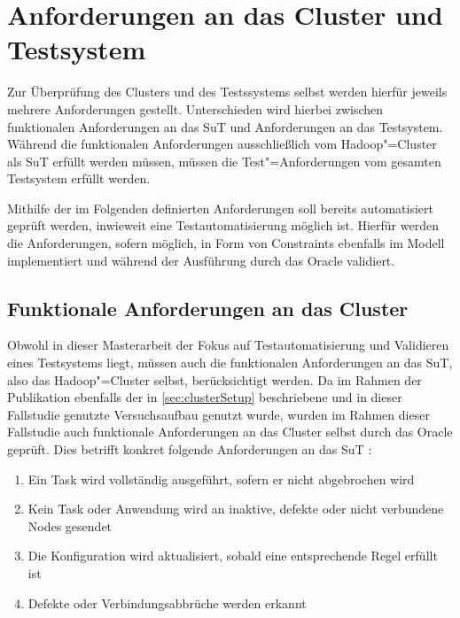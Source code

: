 \section{Anforderungen an das Cluster und Testsystem}
\label{sec:requirements}

Zur Überprüfung des Clusters und des Testssystems selbst werden hierfür jeweils mehrere Anforderungen gestellt.
Unterschieden wird hierbei zwischen funktionalen Anforderungen an das \gls{SuT} und Anforderungen an das Testsystem.
Während die funktionalen Anforderungen ausschließlich vom Hadoop"=Cluster als \gls{SuT} erfüllt werden müssen, müssen die Test"=Anforderungen vom gesamten Testsystem erfüllt werden.

Mithilfe der im Folgenden definierten Anforderungen soll bereits automatisiert geprüft werden, inwieweit eine Testautomatisierung möglich ist.
Hierfür werden die Anforderungen, sofern möglich, in Form von Constraints ebenfalls im Modell implementiert und während der Ausführung durch das Oracle validiert.

\subsection{Funktionale Anforderungen an das Cluster}
\label{subsec:functionalRequirements}

Obwohl in dieser Masterarbeit der Fokus auf Testautomatisierung und Validieren eines Testsystems liegt, müssen auch die funktionalen Anforderungen an das \gls{SuT}, also das Hadoop"=Cluster selbst, berücksichtigt werden.
Da im Rahmen der Publikation \cite{Eberhardinger2018} ebenfalls der in \cref{sec:clusterSetup} beschriebene und in dieser Fallstudie genutzte Versuchsaufbau genutzt wurde, wurden im Rahmen dieser Fallstudie auch funktionale Anforderungen an das Cluster selbst durch das Oracle geprüft.
Dies betrifft konkret folgende Anforderungen an das \gls{SuT} \cite{Eberhardinger2018}:

\begin{enumerate}
    \item Ein Task wird vollständig ausgeführt, sofern er nicht abgebrochen wird
    \item Kein Task oder Anwendung wird an inaktive, defekte oder nicht verbundene Nodes gesendet
    \item Die Konfiguration wird aktualisiert, sobald eine entsprechende Regel erfüllt ist
    \item Defekte oder Verbindungsabbrüche werden erkannt
\end{enumerate}

